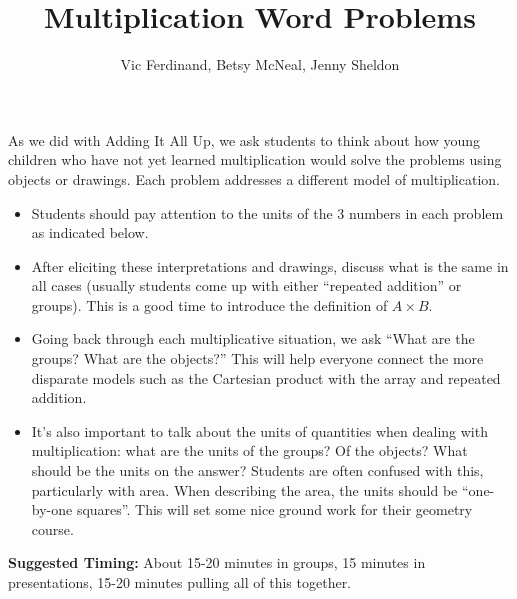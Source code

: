 \documentclass{ximera}
\title{Multiplication Word Problems}
\author{Vic Ferdinand, Betsy McNeal, Jenny Sheldon}
\begin{document}
\begin{abstract} \end{abstract}
\maketitle

\begin{instructorIntro}
As we did with Adding It All Up, we ask students to think about how young children who have not yet learned multiplication would solve the problems using objects or drawings.  Each problem addresses a different model of multiplication. 

\begin{itemize}
	\item Students should pay attention to the units of the 3 numbers in each problem as indicated below.
	\item After eliciting these interpretations and drawings, discuss what is the same in all cases (usually students come up with either ``repeated addition'' or groups).  This is a good time to introduce the definition of $A\times B$.  
	\item Going back through each multiplicative situation, we ask ``What are the groups? What are the objects?''  This will help everyone connect the more disparate models such as the Cartesian product with the array and repeated addition.  
	\item It's also important to talk about the units of quantities when dealing with multiplication: what are the units of the groups?  Of the objects?  What should be the units on the answer?  Students are often confused with this, particularly with area.  When describing the area, the units should be ``one-by-one squares''.  This will set some nice ground work for their geometry course.
\end{itemize}




{\bf Suggested Timing:} About 15-20 minutes in groups, 15 minutes in presentations, 15-20 minutes pulling all of this together.
\end{instructorIntro}
\end{document}
